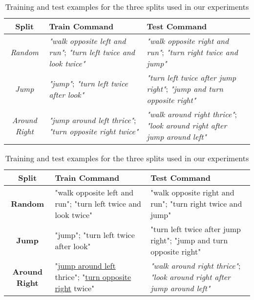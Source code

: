 \begin{table}[t!]
    \footnotesize
    \begin{center}
        \begin{tabular}{| c | p{2.2cm} | p{2.2cm} |}
            \hline \textbf{Split} & \textbf{Train Command} & \textbf{Test Command} \\ \hline
            \textit{Random} & \textit{"walk opposite left and run"}; \textit{"turn left twice and look twice"} & 
                \textit{"walk opposite right and run"}; \textit{"turn right twice and jump"}  \\
            \hline
            \textit{Jump} & \textit{"jump"}; \textit{"turn left twice after look"}  & 
            \textit{"turn left twice after jump right"}; \textit{"jump and turn opposite right"} \\
            \hline
            \textit{Around Right} & \textit{"jump around left thrice"}; \textit{"turn opposite right twice"} & \textit{"walk around right thrice"};
            \textit{"look around right after jump around left"} \\
            \hline
        \end{tabular} 
    \end{center}
    \caption{\label{table:examples} Training and test examples for the three splits used in our experiments }
\end{table}

\iffalse
\begin{table}[t!]
    \footnotesize
    \begin{center}
        \begin{tabular}{| c | p{2.2cm} | p{2.2cm} |}
            \hline \textbf{Split} & \textbf{Train Command} & \textbf{Test Command} \\ \hline
            \textbf{Random} & "walk opposite left and run"; "turn left twice and look twice" & 
                "walk opposite right and run"; "turn right twice and jump"  \\
            \hline
            \textbf{Jump} & "jump"; "turn left twice after look"  & 
            "turn left twice after jump right"; "jump and turn opposite right" \\
            \hline
            \textbf{Around Right} & "\underline{jump around left} thrice"; "\underline{turn opposite right} twice" & \textit{"walk around right thrice"};
            \textit{"look around right after jump around left"} \\
            \hline
        \end{tabular} 
    \end{center}
    \caption{\label{table:examples} Training and test examples for the three splits used in our experiments }
\end{table}

